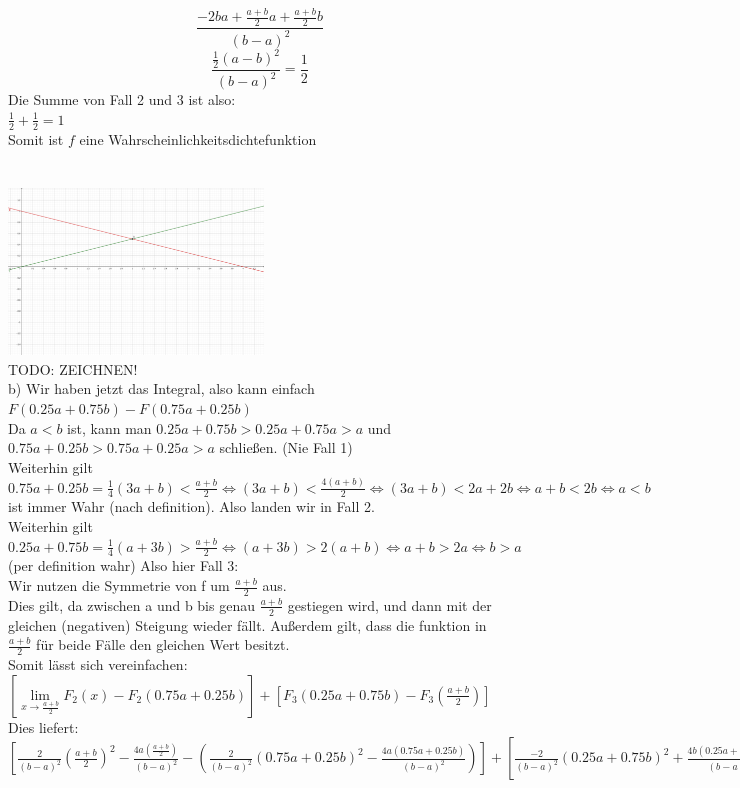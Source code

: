 \documentclass{article}
\begin{document}
	$$\frac{-2ba+\frac{a+b}{2}a+\frac{a+b}{2}b}{(b-a)^2}$$
	$$\frac{\frac{1}{2}(a-b)^2}{(b-a)^2}=\frac{1}{2}$$
	Die Summe von Fall 2 und 3 ist also:\\
	$\frac{1}{2}+\frac{1}{2}=1$\\
	Somit ist $f$ eine Wahrscheinlichkeitsdichtefunktion\\
	\\
	\\
	\includegraphics[width=256px]{geogebra-export.png}\\
	TODO: ZEICHNEN!\\
	b) Wir haben jetzt das Integral, also kann einfach $F(0.25a+0.75b)-F(0.75a+0.25b)$\\
	Da $a<b$ ist, kann man $0.25a+0.75b>0.25a+0.75a>a$ und $0.75a+0.25b>0.75a+0.25a>a$ schließen. (Nie Fall 1)\\
	Weiterhin gilt $0.75a+0.25b=\frac{1}{4} (3a+b)<\frac{a+b}{2}\iff (3a+b)<\frac{4(a+b)}{2}\iff(3a+b)<2a+2b\iff a+b<2b\iff a<b$ ist immer Wahr (nach definition). Also landen wir in Fall 2.\\
	Weiterhin gilt $0.25a+0.75b = \frac{1}{4} (a+3b)> \frac{a+b}{2}\iff (a+3b)> 2(a+b)\iff a+b>2a\iff b>a$ (per definition wahr) Also hier Fall 3:\\
	Wir nutzen die Symmetrie von f um $\frac{a+b}{2}$ aus.\\
	Dies gilt, da zwischen a und b bis genau $\frac{a+b}{2}$ gestiegen wird, und dann mit der gleichen (negativen) Steigung wieder fällt. Außerdem gilt, dass die funktion in $\frac{a+b}{2}$ für beide Fälle den gleichen Wert besitzt.\\
	Somit lässt sich vereinfachen:\\
	$[\lim\limits_{x\to \frac{a+b}{2}} F_2(x)-F_2(0.75a+0.25b)]+ [F_3(0.25a+0.75b)-F_3(\frac{a+b}{2})]$\\
	Dies liefert:\\
	$[\frac{2}{(b-a)^2}(\frac{a+b}{2})^2-\frac{4a(\frac{a+b}{2})}{(b-a)^2}-(\frac{2}{(b-a)^2}(0.75a+0.25b)^2-\frac{4a(0.75a+0.25b)}{(b-a)^2})]+ [\frac{-2}{(b-a)^2}(0.25a+0.75b)^2+\frac{4b(0.25a+0.75b)}{(b-a)^2}-(\frac{-2}{(b-a)^2}(\frac{a+b}{2})^2+\frac{4b(\frac{a+b}{2})}{(b-a)^2})]$\\
\end{document}

